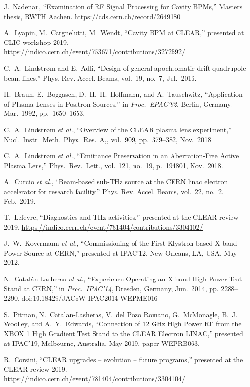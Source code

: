 \documentclass[a4paper,
               keeplastbox,   %
               ]{jacow}
\begin{document}
\begin{thebibliography}{99}
 J.\ Nadenau, “Examination of RF Signal Processing for Cavity BPMs,” Masters thesis, RWTH Aachen. \url{https://cds.cern.ch/record/2649180}

 A.\ Lyapin, M.\ Cargnelutti, M.\ Wendt, “Cavity BPM at CLEAR,” presented at CLIC workshop 2019. \url{https://indico.cern.ch/event/753671/contributions/3272592/}

 C.\ A.\ Lindstrøm and E.\ Adli, “Design of general apochromatic drift-quadrupole beam lines,” Phys. Rev. Accel. Beams, vol.\ 19, no.\ 7, Jul.\ 2016.


 H.\ Braun, E.\ Boggasch, D.\ H.\ H.\ Hoffmann, and A.\ Tauschwitz, “Application of Plasma Lenses in Positron Sources,” in \emph{Proc.\ EPAC'92}, Berlin, Germany, Mar.\ 1992, pp.\ 1650--1653.


 C.\ A.\ Lindstrøm \emph{et al.}, “Overview of the CLEAR plasma lens experiment,” Nucl.\ Instr.\ Meth.\ Phys.\ Res.\ A,, vol.\ 909, pp.\ 379--382, Nov.\ 2018.

 C.\ A.\ Lindstrøm \emph{et al.}, “Emittance Preservation in an Aberration-Free Active Plasma Lens,” Phys.\ Rev.\ Lett., vol.\ 121, no.\ 19, p.\ 194801, Nov.\ 2018.

 A.\ Curcio \emph{et al.}, “Beam-based sub-THz source at the CERN linac electron accelerator for research facility,” Phys. Rev. Accel. Beams, vol.\ 22, no.\ 2, Feb.\ 2019.

 T.\ Lefevre, “Diagnostics and THz activities,” presented at the CLEAR review 2019. \url{https://indico.cern.ch/event/781404/contributions/3304102/}

 J.\ W.\ Kovermann \emph{et al.}, “Commissioning of the First Klystron-based X-band Power Source at CERN,” presented at IPAC’12, New Orleans, LA, USA, May 2012.

 N.\ Catalán Lasheras \emph{et al.}, “Experience Operating an X-band High-Power Test Stand at CERN,” in \emph{Proc.\ IPAC'14}, Dresden, Germany, Jun.\ 2014, pp. 2288--2290. \url{doi:10.18429/JACoW-IPAC2014-WEPME016}

   S.\ Pitman, N.\ Catalan-Lasheras, V.\ del Pozo Romano, G.\ McMonagle, B.\ J. Woolley, and A.\ V.\ Edwards,
   “Connection of 12 GHz High Power RF from the XBOX 1 High Gradient Test Stand to the CLEAR Electron LINAC,”
   presented at IPAC'19, Melbourne, Australia, May 2019, paper WEPRB063.

 R.\ Corsini, “CLEAR upgrades -- evolution -- future programs,” presented at the CLEAR review 2019. \url{https://indico.cern.ch/event/781404/contributions/3304104/}

\end{thebibliography}
\end{document}
